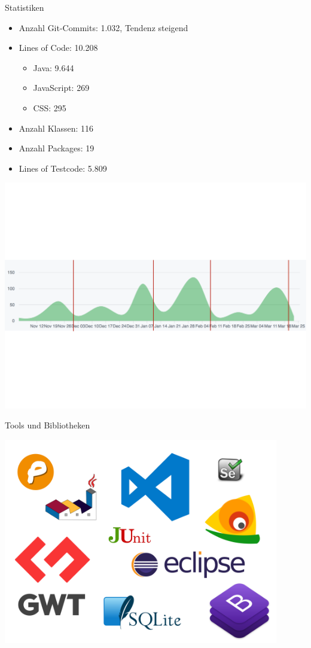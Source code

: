 \documentclass[10pt]{beamer}
\begin{document}
\begin{frame}{Statistiken}{}
	\begin{itemize}
		\item Anzahl Git-Commits: 1.032, Tendenz steigend
		\item Lines of Code: 10.208
		\begin{itemize}
			\item Java: 9.644
			\item JavaScript: 269
			\item CSS: 295
		\end{itemize}
		\item Anzahl Klassen: 116
		\item Anzahl Packages: 19
		\item Lines of Testcode: 5.809 
	\end{itemize}
	
    \includegraphics[width = \textwidth]{img/GitCommitsAbgabe}
\end{frame}

\begin{frame}{Tools und Bibliotheken}{}
	\begin{center}
    \includegraphics[width=0.9\textwidth]{img/alle}
	\end{center}
\end{frame}
\end{document}
